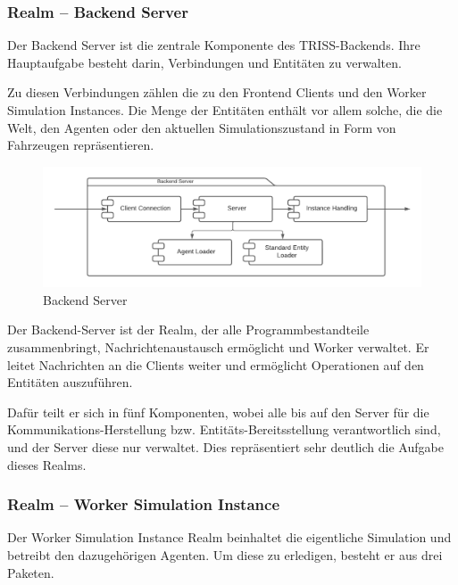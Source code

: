 \subsubsection{Realm – Backend Server}

Der Backend Server ist die zentrale Komponente des TRISS-Backends.
Ihre Hauptaufgabe besteht darin, Verbindungen und Entitäten zu verwalten.

Zu diesen Verbindungen zählen die zu den Frontend Clients und den Worker Simulation Instances.
Die Menge der Entitäten enthält vor allem solche, die die Welt, den Agenten oder den aktuellen Simulationszustand in Form von Fahrzeugen repräsentieren.

\begin{figure}[htb]
    \includegraphics[scale=.65,center=\linewidth]{medien/backend-server.pdf}
    \caption{Backend Server}
    \ownsource
    \label{fig:backend-server}
\end{figure}

\FloatBarrier

Der Backend-Server ist der Realm, der alle Programmbestandteile zusammenbringt, Nachrichtenaustausch ermöglicht und Worker verwaltet.
Er leitet Nachrichten an die Clients weiter und ermöglicht Operationen auf den Entitäten auszuführen.

Dafür teilt er sich in fünf Komponenten, wobei alle bis auf den Server für die Kommunikations-Herstellung bzw. Entitäts-Bereitsstellung verantwortlich sind, und der Server diese nur verwaltet.
Dies repräsentiert sehr deutlich die Aufgabe dieses Realms.

\subsubsection{Realm – Worker Simulation Instance}

Der Worker Simulation Instance Realm beinhaltet die eigentliche Simulation und betreibt den dazugehörigen Agenten.
Um diese zu erledigen, besteht er aus drei Paketen.

